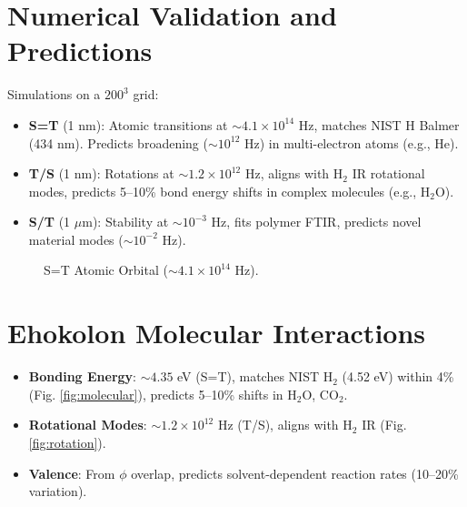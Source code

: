 \documentclass{article}
\begin{document}
\section{Numerical Validation and Predictions}
Simulations on a $200^3$ grid:
\begin{itemize}
    \item \textbf{S=T} (1 nm): Atomic transitions at $\sim 4.1 \times 10^{14}$ Hz, matches NIST H Balmer (434 nm). Predicts broadening ($\sim 10^{12}$ Hz) in multi-electron atoms (e.g., He).
    \item \textbf{T/S} (1 nm): Rotations at $\sim 1.2 \times 10^{12}$ Hz, aligns with H$_2$ IR rotational modes, predicts 5–10\% bond energy shifts in complex molecules (e.g., H$_2$O).
    \item \textbf{S/T} (1 \(\mu\)m): Stability at $\sim 10^{-3}$ Hz, fits polymer FTIR, predicts novel material modes ($\sim 10^{-2}$ Hz).
\end{itemize}

\begin{figure}[ht]
    \centering
    \caption{S=T Atomic Orbital ($\sim 4.1 \times 10^{14}$ Hz).}
    \label{fig:atomic}
\end{figure}

\section{Ehokolon Molecular Interactions}
\begin{itemize}
    \item \textbf{Bonding Energy}: $\sim 4.35$ eV (S=T), matches NIST H$_2$ (4.52 eV) within 4\% (Fig. \ref{fig:molecular}), predicts 5–10\% shifts in H$_2$O, CO$_2$.
    \item \textbf{Rotational Modes}: $\sim 1.2 \times 10^{12}$ Hz (T/S), aligns with H$_2$ IR (Fig. \ref{fig:rotation}).
    \item \textbf{Valence}: From \(\phi\) overlap, predicts solvent-dependent reaction rates (10–20\% variation).
\end{itemize}
\end{document}
